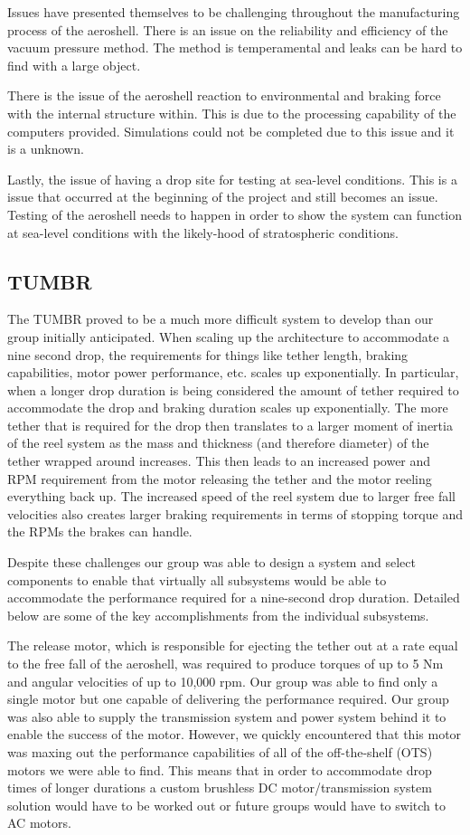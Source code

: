 Issues have presented themselves to be challenging throughout the manufacturing process of the aeroshell. There is an issue on the reliability and efficiency of the vacuum pressure method. The method is temperamental and leaks can be hard to find with a large object.

There is the issue of the aeroshell reaction to environmental and braking force with the internal structure within. This is due to the processing capability of the computers provided. Simulations could not be completed due to this issue and it is a unknown.

Lastly, the issue of having a drop site for testing at sea-level conditions. This is a issue that occurred at the beginning of the project and still becomes an issue. Testing of the aeroshell needs to happen in order to show the system can function at sea-level conditions with the likely-hood of stratospheric conditions.

\subsection{TUMBR}

\indent\indent The TUMBR proved to be a much more difficult system to develop than our group initially anticipated. When scaling up the architecture to accommodate a nine second drop, the requirements for things like tether length, braking capabilities, motor power performance, etc. scales up exponentially. In particular, when a longer drop duration is being considered the amount of tether required to accommodate the drop and braking duration scales up exponentially. The more tether that is required for the drop then translates to a larger moment of inertia of the reel system as the mass and thickness (and therefore diameter) of the tether wrapped around increases. This then leads to an increased power and RPM requirement from the motor releasing the tether and the motor reeling everything back up. The increased speed of the reel system due to larger free fall velocities also creates larger braking requirements in terms of stopping torque and the RPMs the brakes can handle. 

Despite these challenges our group was able to design a system and select components to enable that virtually all subsystems would be able to accommodate the performance required for a nine-second drop duration. Detailed below are some of the key accomplishments from the individual subsystems. 

The release motor, which is responsible for ejecting the tether out at a rate equal to the free fall of the aeroshell, was required to produce torques of up to 5 Nm and angular velocities of up to 10,000 rpm. Our group was able to find only a single motor but one capable of delivering the performance required. Our group was also able to supply the transmission system and power system behind it to enable the success of the motor. However, we quickly encountered that this motor was maxing out the performance capabilities of all of the off-the-shelf (OTS) motors we were able to find. This means that in order to accommodate drop times of longer durations a custom brushless DC motor/transmission system solution would have to be worked out or future groups would have to switch to AC motors. 

